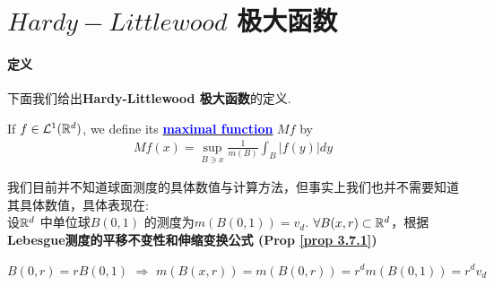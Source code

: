 \newpage
\section{$Hardy-Littlewood$ 极大函数}
\paragraph{定义}
	下面我们给出\textbf{Hardy-Littlewood 极大函数}的定义.
	\begin{defn}\label{def 4.1.1}
		If $f \in \mathcal{L}^{1}(\mathbb{R}^d)$, we define its \underline{\textcolor{blue}{\textbf{maximal function}}} $Mf$ by
		\begin{align}
			Mf(x) = \sup_{B \ni x}{\frac{1}{m(B)} \int_{B}{\left| f(y) \right| dy}}
		\end{align}
	
		\vspace{1em}
		\begin{rmk}
			我们目前并不知道球面测度的具体数值与计算方法，但事实上我们也并不需要知道其具体数值，具体表现在: \\
			设$\mathbb{R}^d$ 中单位球$B(0 , 1)$ 的测度为$m(B(0 , 1)) = v_d$. $\forall B(x , r) \subset \mathbb{R}^d$，根据\textbf{Lebesgue测度的平移不变性和伸缩变换公式 (Prop \ref{prop 3.7.1})}
			\begin{center}
				$B(0 , r) = r B(0 , 1) \,\, \Rightarrow \,\, m(B(x , r)) = m(B(0 , r)) = r^d m(B(0 , 1)) = r^d v_d$
			\end{center}
		\end{rmk}
	\end{defn}

\vspace{2em}
